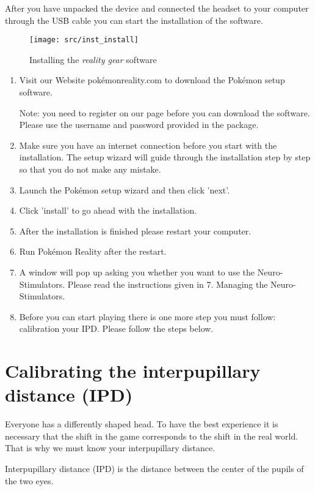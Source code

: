 After you have unpacked the device and connected the headset to your computer through the USB cable you can start the installation of the software.
\begin{figure}[!ht]
\begin{center}
\texttt{[image: src/inst\_install]}
\end{center}
\caption[Installing the \emph{\pokeT{} reality gear} software]{Installing the \emph{\poke{} reality gear} software}
\label{gear_install}
\end{figure}
\begin{enumerate}
\item Visit our Website pokémonreality.com to download the Pokémon setup software. 

Note: you need to register on our page before you can download the software. Please use the username and password provided in the package.
\item Make sure you have an internet connection before you start with the installation. The setup wizard will guide through the installation step by step so that you do not make any mistake. 
\item Launch the Pokémon setup wizard and then click 'next'.
\item Click 'install' to go ahead with the installation.
\item After the installation is finished please restart your computer. 
\item Run Pokémon Reality after the restart.
\item A window will pop up asking you whether you want to use the Neuro-Stimulators. Please read the instructions given in 7. Managing the Neuro-Stimulators.
\item Before you can start playing there is one more step you must follow: calibration your IPD.  Please follow the steps below.
\end{enumerate}


\section{Calibrating the interpupillary distance (IPD)}

Everyone has a differently shaped head. To have the best experience it is necessary that the shift in the game corresponds to the shift in the real world. That is why we must know your interpupillary distance. 

Interpupillary distance (IPD) is the distance between the center of the pupils of the two eyes.

